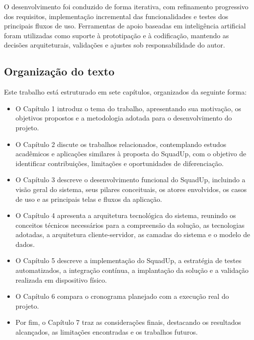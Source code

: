 \documentclass[a4paper, 12pt]{article}
\begin{document}
\begin{justify}
O desenvolvimento foi conduzido de forma iterativa, com refinamento progressivo dos requisitos, implementação incremental das funcionalidades e testes dos principais fluxos de uso. Ferramentas de apoio baseadas em inteligência artificial foram utilizadas como suporte à prototipação e à codificação, mantendo as decisões arquiteturais, validações e ajustes sob responsabilidade do autor.

\subsection{Organização do texto}

Este trabalho está estruturado em sete capítulos, organizados da seguinte forma:

\begin{itemize}
    \item O Capítulo 1 introduz o tema do trabalho, apresentando sua motivação, os objetivos propostos e a metodologia adotada para o desenvolvimento do projeto.
    
    \item O Capítulo 2 discute os trabalhos relacionados, contemplando estudos acadêmicos e aplicações similares à proposta do SquadUp, com o objetivo de identificar contribuições, limitações e oportunidades de diferenciação.
    
    \item O Capítulo 3 descreve o desenvolvimento funcional do SquadUp, incluindo a visão geral do sistema, seus pilares conceituais, os atores envolvidos, os casos de uso e as principais telas e fluxos da aplicação.
    
    \item O Capítulo 4 apresenta a arquitetura tecnológica do sistema, reunindo os conceitos técnicos necessários para a compreensão da solução, as tecnologias adotadas, a arquitetura cliente-servidor, as camadas do sistema e o modelo de dados.

    \item O Capítulo 5 descreve a implementação do SquadUp, a estratégia de testes automatizados, a integração contínua, a implantação da solução e a validação realizada em dispositivo físico.

    \item O Capítulo 6 compara o cronograma planejado com a execução real do projeto.

    \item Por fim, o Capítulo 7 traz as considerações finais, destacando os resultados alcançados, as limitações encontradas e os trabalhos futuros.
\end{itemize}


\end{justify}
\end{document}
